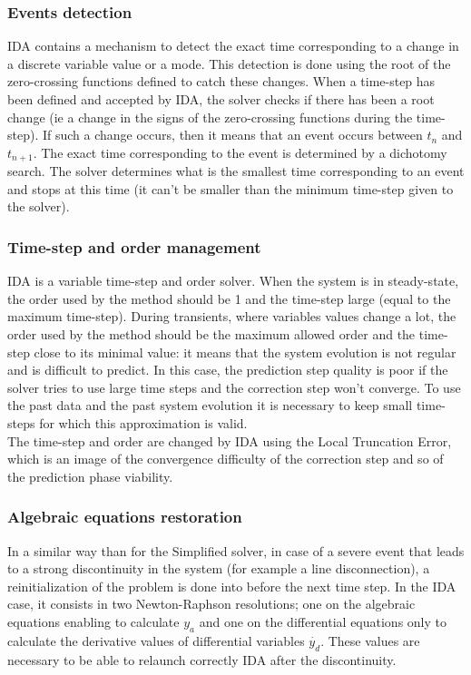 \documentclass[a4paper, 12pt]{report}
\begin{document}
\subsubsection{Events detection}

\ac{IDA} contains a mechanism to detect the exact time corresponding to a change in a discrete variable value or a mode. This detection is done using the root of the zero-crossing functions defined to catch these changes.
When a time-step has been defined and accepted by \ac{IDA}, the solver checks if there has been a root change (ie a change in the signs of the zero-crossing functions during the time-step). If such a change occurs, then it means that an event occurs between $t_{n}$ and $t_{n+1}$. The exact time corresponding to the event is determined by a dichotomy search.
The solver determines what is the smallest time corresponding to an event and stops at this time (it can't be smaller than the minimum time-step given to the solver).

\subsubsection{Time-step and order management}

\ac{IDA} is a variable time-step and order solver. When the system is in steady-state, the order used by the method should be 1 and the time-step large (equal to the maximum time-step). During transients, where variables values change a lot, the order used by the method should be the maximum allowed order and the time-step close to its minimal value: it means that the system evolution is not regular and is difficult to predict. In this case, the prediction step quality is poor if the solver tries to use large time steps and the correction step won't converge. To use the past data and the past system evolution it is necessary to keep small time-steps for which this approximation is valid. \\

The time-step and order are changed by \ac{IDA} using the Local Truncation Error, which is an image of the convergence difficulty of the correction step and so of the prediction phase viability.

\subsubsection{Algebraic equations restoration}

In a similar way than for the Simplified solver, in case of a severe event that leads to a strong discontinuity in the system (for example a line disconnection), a reinitialization of the problem is done into \Dynawo before the next time step.
In the \ac{IDA} case, it consists in two Newton-Raphson resolutions; one on the algebraic equations enabling to calculate $y_a$ and one on the differential equations only to calculate the derivative values of differential variables $\dot{y_d}$. These values are necessary to be able to relaunch correctly \ac{IDA} after the discontinuity.
\end{document}
